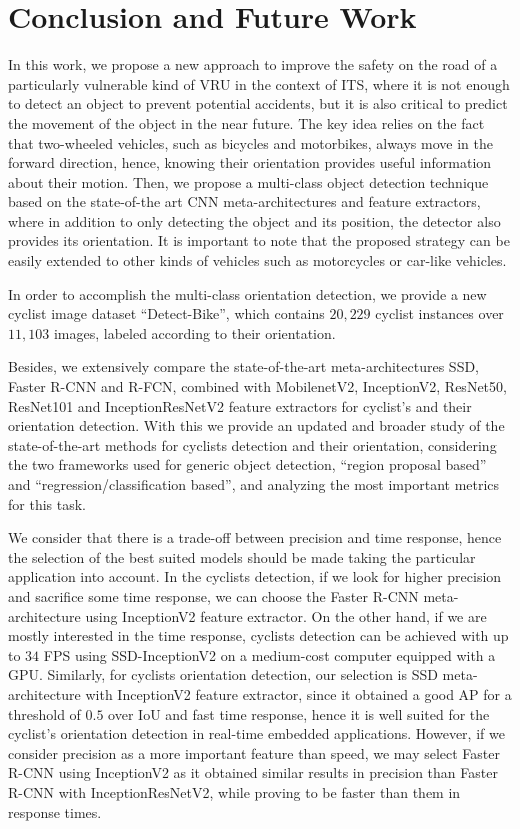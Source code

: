 \documentclass[journal]{IEEEtran}
\begin{document}
\section{Conclusion and Future Work}
\label{sec:Conclusion}

In this work, we propose a new approach to improve the safety on the road of a particularly vulnerable kind of VRU in the context of ITS, where it is not enough to detect an object to prevent potential accidents, but it is also critical to predict the movement of the object in the near future. The key idea relies on the fact that two-wheeled vehicles, such as bicycles and motorbikes, always move in the forward direction, hence, knowing their orientation provides useful information about their motion. Then, we propose a multi-class object detection technique based on the state-of-the art CNN meta-architectures and feature extractors, where in addition to only detecting the object and its position, the detector also provides its orientation. It is important to note that the proposed strategy can be easily extended to other kinds of vehicles such as motorcycles or car-like vehicles.

In order to accomplish the multi-class orientation detection, we provide a new cyclist image dataset ``Detect-Bike'', which contains $20,229$ cyclist instances over $11,103$ images, labeled according to their orientation. 

Besides, we extensively compare the state-of-the-art meta-architectures SSD, Faster R-CNN and R-FCN, combined with MobilenetV2, InceptionV2, ResNet50, ResNet101 and InceptionResNetV2 feature extractors for cyclist's and their orientation detection. With this we provide an updated and broader study of the state-of-the-art methods for cyclists detection and their orientation, considering the two frameworks used for generic object detection, ``region proposal based'' and ``regression/classification based'', and analyzing the most important metrics for this task.

We consider that there is a trade-off between precision and time response, hence the selection of the best suited models should be made taking the particular application into account. In the cyclists detection, if we look for higher precision and sacrifice some time response, we can choose the Faster R-CNN meta-architecture using InceptionV2 feature extractor. On the other hand, if we are mostly interested in the time response, cyclists detection can be achieved with up to $34$ FPS using SSD-InceptionV2 on a medium-cost computer equipped with a GPU. Similarly, for cyclists orientation detection, our selection is SSD meta-architecture with InceptionV2 feature extractor, since it obtained a good AP for a threshold of $0.5$ over IoU and fast time response, hence it is well suited for the cyclist's orientation detection in real-time embedded applications. However, if we consider precision as a more important feature than speed, we may select Faster R-CNN using InceptionV2 as it obtained similar results in precision than Faster R-CNN with InceptionResNetV2, while proving to be faster than them in response times.
 
\end{document}
